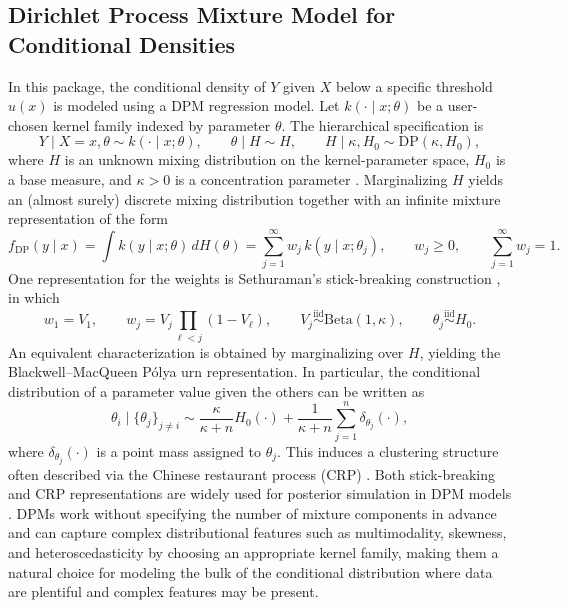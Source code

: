 \documentclass[article]{jss}\usepackage[]{graphicx}\usepackage[]{xcolor}
\begin{document}
\subsection{Dirichlet Process Mixture Model for Conditional Densities}
\label{subsec:dpm}

In this package, the conditional density of $Y$ given $X$ below a
specific threshold $u(x)$ is modeled using a DPM regression model. Let
$k(\cdot\mid x;\theta)$ be a user-chosen kernel family indexed by
parameter $\theta$. The hierarchical specification is
\begin{equation}
Y \mid X=x,\theta \sim k(\cdot\mid x;\theta),
\qquad
\theta \mid H \sim H,
\qquad
H \mid \kappa,H_0 \sim \mathrm{DP}(\kappa,H_0),
\label{eq:dpm_hier}
\end{equation}
where $H$ is an unknown mixing distribution on the kernel-parameter
space, $H_0$ is a base measure, and $\kappa>0$ is a concentration
parameter \citep{Ferguson1973}. Marginalizing $H$ yields an
(almost surely) discrete mixing distribution together with an infinite
mixture representation of the form
\begin{equation}
f_{\mathrm{DP}}(y\mid x)
=
\int k(y\mid x;\theta)\,dH(\theta)
=
\sum_{j=1}^{\infty} w_j\,k(y\mid x;\theta_j),
\qquad
w_j\ge 0,
\qquad
\sum_{j=1}^{\infty} w_j=1.
\label{eq:dpm_mixture}
\end{equation}
One representation for the weights is Sethuraman's stick-breaking
construction \citep{Sethuraman1994}, in which
\begin{equation}
w_1=V_1,
\qquad
w_j=V_j\prod_{\ell<j}(1-V_\ell),
\qquad
V_j \stackrel{\mathrm{iid}}{\sim}\mathrm{Beta}(1,\kappa),
\qquad
\theta_j \stackrel{\mathrm{iid}}{\sim} H_0.
\label{eq:sb}
\end{equation}
An equivalent characterization is obtained by marginalizing over $H$,
yielding the Blackwell--MacQueen P\'olya urn representation. In
particular, the conditional distribution of a parameter value given the
others can be written as
\begin{equation}
\theta_i \mid \{\theta_j\}_{j \neq i}
\sim
\frac{\kappa}{\kappa+n} H_0(\cdot)
+
\frac{1}{\kappa+n}\sum_{j=1}^{n}\delta_{\theta_j}(\cdot),
\label{eq:crp}
\end{equation}
where $\delta_{\theta_j}(\cdot)$ is a point mass assigned to $\theta_j$.
This induces a clustering structure often described via the Chinese
restaurant process (CRP) \citep{Neal2000}. Both
stick-breaking and CRP representations are widely used for posterior
simulation in DPM models \citep{EscobarWest1995,Neal2000}. DPMs work
without specifying the number of mixture components in advance and can
capture complex distributional features such as multimodality, skewness,
and heteroscedasticity by choosing an appropriate kernel family, making
them a natural choice for modeling the bulk of the conditional
distribution where data are plentiful and complex features may be
present.
\end{document}
